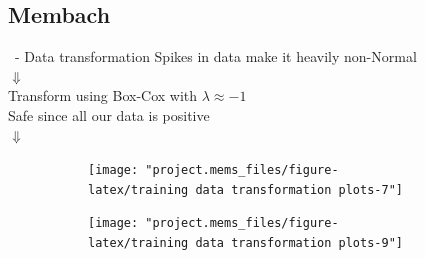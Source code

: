 \documentclass{beamer}
\begin{document}
\subsection{Membach}

\begin{frame}{\subsecname~- Data transformation}\centering
	Spikes in data make it heavily non-Normal\\$\Downarrow$\\
	Transform using Box-Cox with $\lambda\approx-1$\\ %
	\vspace{.5em}\small Safe since all our data is positive\\\vspace{1em}\large$\Downarrow$\vspace{.5em}\\
	\begin{figure}
		\begin{subfigure}{.49\linewidth}
			\texttt{[image: "project.mems\_files/figure-latex/training data transformation plots-7"]}
		\end{subfigure}
		\begin{subfigure}{.49\linewidth}
			\texttt{[image: "project.mems\_files/figure-latex/training data transformation plots-9"]}
		\end{subfigure}
	\end{figure}
\end{frame}
\end{document}
